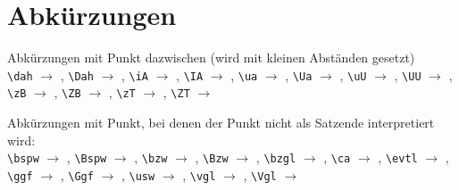 \section*{Abkürzungen}
Abkürzungen mit Punkt \glqq{}dazwischen\grqq{} (wird mit kleinen Abständen gesetzt)\\
\verb|\dah| $\rightarrow$ \dah, \verb|\Dah| $\rightarrow$ \Dah, \verb|\iA| $\rightarrow$ \iA, \verb|\IA| $\rightarrow$ \IA, \verb|\ua| $\rightarrow$ \ua, \verb|\Ua| $\rightarrow$ \Ua, \verb|\uU| $\rightarrow$ \uU, \verb|\UU| $\rightarrow$ \UU, \verb|\zB| $\rightarrow$ \zB, \verb|\ZB| $\rightarrow$ \ZB, \verb|\zT| $\rightarrow$ \zT, \verb|\ZT| $\rightarrow$ \ZT

\vspace{1ex}
\noindent Abkürzungen mit Punkt, bei denen der Punkt nicht als Satzende interpretiert wird:\\
\verb|\bspw| $\rightarrow$ \bspw, \verb|\Bspw| $\rightarrow$ \Bspw, \verb|\bzw| $\rightarrow$ \bzw, \verb|\Bzw| $\rightarrow$ \Bzw,  \verb|\bzgl| $\rightarrow$ \bzgl, \verb|\ca| $\rightarrow$ \ca, \verb|\evtl| $\rightarrow$ \evtl, \verb|\ggf| $\rightarrow$ \ggf, \verb|\Ggf| $\rightarrow$ \Ggf, \verb|\usw| $\rightarrow$ \usw, \verb|\vgl| $\rightarrow$ \vgl, \verb|\Vgl| $\rightarrow$ \Vgl

